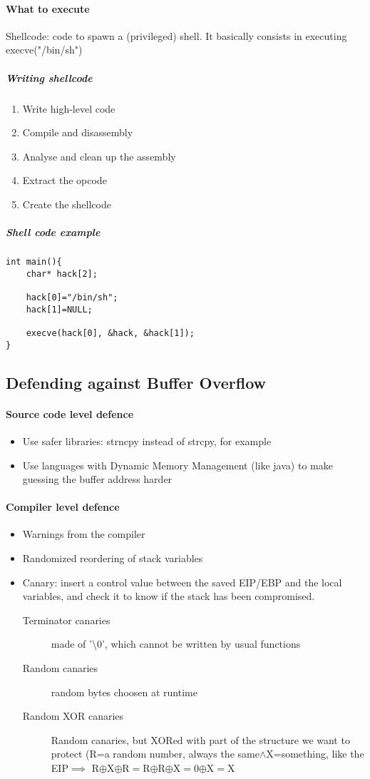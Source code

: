 \documentclass{article}
\newcommand{\xor}{\oplus}
\begin{document}
\paragraph{What to execute} Shellcode: code to spawn a (privileged) shell. It basically consists in executing execve("/bin/sh") 
\subparagraph{Writing shellcode}
\begin{enumerate}
\item Write high-level code
\item Compile and disassembly
\item Analyse and clean up the assembly
\item Extract the opcode
\item Create the shellcode
\end{enumerate}
\subparagraph{Shell code example}
\begin{lstlisting}[style=CStyle]
int main(){
	char* hack[2];
	
	hack[0]="/bin/sh";
	hack[1]=NULL;
	
	execve(hack[0], &hack, &hack[1]);
}
\end{lstlisting}
\subsection{Defending against Buffer Overflow}
\label{sec:defending buffer overflow}
\paragraph{Source code level defence}
\begin{itemize}
\item Use safer libraries: strncpy instead of strcpy, for example
\item Use languages with Dynamic Memory Management (like java) to make guessing the buffer address harder
\end{itemize}
\paragraph{Compiler level defence}
\begin{itemize}
\item Warnings from the compiler
\item Randomized reordering of stack variables
\item Canary: insert a control value between the saved EIP/EBP and the local variables, and check it to know if the stack has been compromised. 
	\begin{description}
	\item[Terminator canaries] made of '\textbackslash 0', which cannot be written by usual functions
	\item[Random canaries] random bytes choosen at runtime
	\item[Random XOR canaries] Random canaries, but XORed with part of the structure we want to protect (R=a random number, always the same$\wedge$X=something, like the EIP$\implies$ R$\xor$X$\xor$R$=$R$\xor$R$\xor$X$=$0$\xor$X$=$X
	\end{description}
\end{itemize}
\end{document}
